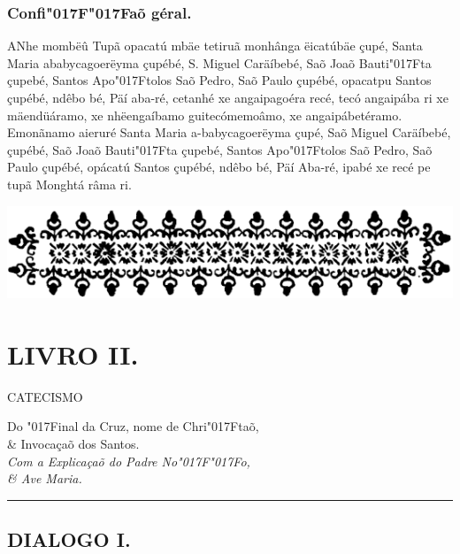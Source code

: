 \documentclass[openany,titlepage,12pt]{book}
\newcommand{\lgS}{\char"017F}
\newcommand{\lgSS}{\char"017F\char"017F}
\begin{document}
\subsection{Confi\lgSS aõ géral.}

\lettrine[findent =2pt, nindent=0pt, lines=2]
{A}{N}he mombëû Tupã opacatú mbäe tetiruã monhânga ëicatúbäe
çupé, Santa Maria ababycagoerëyma çupébé, S. Miguel Caräíbebé,
Saõ Joaõ Bauti\lgS ta çupebé, Santos Apo\lgS tolos Saõ Pedro,
Saõ Paulo çupébé, opacatpu Santos çupébé, ndêbo bé, Päí aba-ré,
cetanhé xe angaipagoéra recé, tecó angaipába ri xe mäendüáramo,
xe nhëengaíbamo guitecómemoâmo, xe angaipábetéramo. Emonãnamo
aieruré Santa Maria a-babycagoerëyma çupé, Saõ Miguel Caräíbebé,
çupébé, Saõ Joaõ Bauti\lgS ta çupebé, Santos Apo\lgS tolos
Saõ Pedro, Saõ Paulo çupébé, opácatú Santos çupébé, ndêbo bé,
Päí Aba-ré, ipabé xe recé pe tupã Monghtá râma ri.

\newpage
\begin{center}
    \vspace*{20pt}
    \includegraphics[scale=0.33]{10.livro2.png}
\end{center}
\unskip
\vspace{-30pt}
{\let\clearpage\relax \chapter{\Huge LIVRO II.}}
\unskip
\vspace{-2pt}
\begin{center}
    {\large CATECISMO}
\end{center}
\unskip
\begin{center}
    Do \lgS inal da Cruz, nome de Chri\lgS taõ,\\
    \& Invocaçaõ dos Santos.\\
    \vspace{6pt}\textit{Com a Explicaçaõ do Padre No\lgSS o,\\
    \& Ave Maria.}
\end{center}
\unskip
\par\noindent\rule{\textwidth}{0.4pt}
\unskip\vspace{-3pt}
\section{DIALOGO I.}
\unskip\vspace{-3pt}
\end{document}
